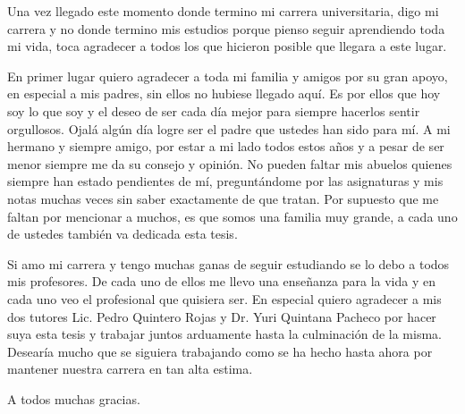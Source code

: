 \begin{acknowledgements}

Una vez llegado este momento donde termino mi carrera universitaria, digo mi carrera y no donde termino mis estudios porque pienso seguir aprendiendo toda mi vida, toca agradecer a todos los que hicieron posible que llegara a este lugar.

En primer lugar quiero agradecer a toda mi familia y amigos por su gran apoyo, en especial a mis padres, sin ellos no hubiese llegado aqu\'i. Es por ellos que hoy soy lo que soy y el deseo de ser cada d\'ia mejor para siempre hacerlos sentir orgullosos. Ojal\'a alg\'un d\'ia logre ser el padre que ustedes han sido para m\'i. A mi hermano y siempre amigo, por estar a mi lado todos estos a\~nos y a pesar de ser menor siempre me da su consejo y opini\'on. No pueden faltar mis abuelos quienes siempre han estado pendientes de m\'i, pregunt\'andome por las asignaturas y mis notas muchas veces sin saber exactamente de que tratan. Por supuesto que me faltan por mencionar a muchos, es que somos una familia muy grande, a cada uno de ustedes tambi\'en va dedicada esta tesis.

Si amo mi carrera y tengo muchas ganas de seguir estudiando se lo debo a todos mis profesores. De cada uno de ellos me llevo una ense\~nanza para la vida y en cada uno veo el profesional que quisiera ser. En especial quiero agradecer a mis dos tutores Lic. Pedro Quintero Rojas y Dr. Yuri Quintana Pacheco por hacer suya esta tesis y trabajar juntos arduamente hasta la culminaci\'on de la misma. Desear\'ia mucho que se siguiera trabajando como se ha hecho hasta ahora por mantener nuestra carrera en tan alta estima.

A todos muchas gracias.

\end{acknowledgements}